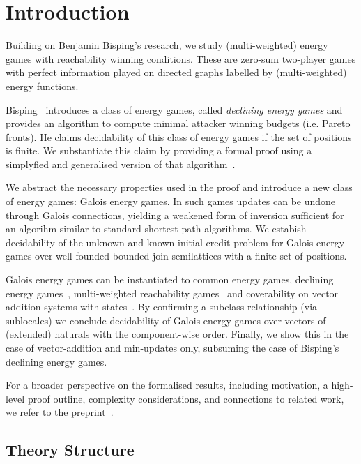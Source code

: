 \newpage
\section{Introduction}
 
\noindent
Building on Benjamin Bisping's research\cite{bens-algo}, 
we study (multi-weighted) energy games with reachability winning conditions. 
These are zero-sum two-player games with perfect information played on directed graphs 
labelled by (multi-weighted) energy functions. 

Bisping~\cite{bens-algo} introduces a class of energy games, called \textit{declining energy games} 
and provides an algorithm to compute minimal attacker winning budgets (i.e. Pareto fronts).
He claims decidability of this class of energy games if the set of positions is finite.
We substantiate this claim by providing a formal proof using a simplyfied and generalised version 
of that algorithm~\cite{Lemke2024}.

We abstract the necessary properties used in the proof and introduce a new 
class of energy games: Galois energy games. In such games updates can be 
undone through Galois connections, yielding a weakened form of inversion 
sufficient for an algorihm similar to standard shortest path algorithms.
We estabish decidability of the unknown and known initial credit problem for Galois energy games 
over well-founded bounded join-semilattices with a finite set of positions.

Galois energy games can be instantiated to common energy games, declining energy games~\cite{bens-algo}, multi-weighted reachability games~\cite{lexicograph} and  
coverability on vector addition systems with states~\cite{kunnemann2023coverability}. 
By confirming a subclass relationship (via sublocales) we conclude decidability of Galois energy games 
over vectors of (extended) naturals with the component-wise order. Finally, we show this in the case 
of vector-addition and min-updates only, subsuming the case of Bisping's declining energy games.

For a broader perspective on the formalised results, including motivation, a high-level proof outline, 
complexity considerations, and connections to related work, we refer to the preprint~\cite{preprint}.

\subsection*{Theory Structure}

